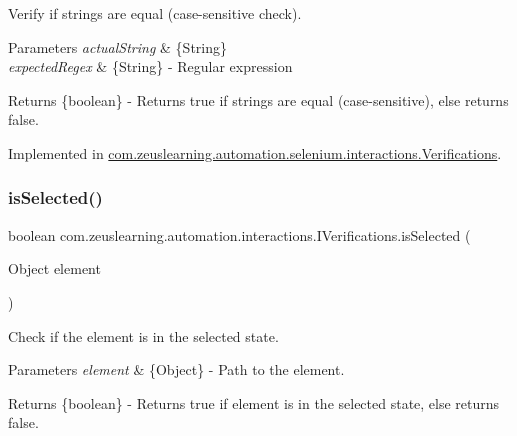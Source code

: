 Verify if strings are equal (case-\/sensitive check).


\begin{DoxyParams}{Parameters}
{\em actual\+String} & \{String\} \\
\hline
{\em expected\+Regex} & \{String\} -\/ Regular expression \\
\hline
\end{DoxyParams}
\begin{DoxyReturn}{Returns}
\{boolean\} -\/ Returns {\ttfamily true} if strings are equal (case-\/sensitive), else returns {\ttfamily false}. 
\end{DoxyReturn}


Implemented in \hyperlink{classcom_1_1zeuslearning_1_1automation_1_1selenium_1_1interactions_1_1Verifications_aec4f646bd4791291b242ad202fd928ea}{com.\+zeuslearning.\+automation.\+selenium.\+interactions.\+Verifications}.

\hypertarget{interfacecom_1_1zeuslearning_1_1automation_1_1interactions_1_1IVerifications_a5525ec4429db243e34b16151f78fa2d9}{}\label{interfacecom_1_1zeuslearning_1_1automation_1_1interactions_1_1IVerifications_a5525ec4429db243e34b16151f78fa2d9} 
\subsubsection{\texorpdfstring{is\+Selected()}{isSelected()}}
{\footnotesize\ttfamily boolean com.\+zeuslearning.\+automation.\+interactions.\+I\+Verifications.\+is\+Selected (\begin{DoxyParamCaption}\item[{Object}]{element }\end{DoxyParamCaption})}

Check if the element is in the selected state.


\begin{DoxyParams}{Parameters}
{\em element} & \{Object\} -\/ Path to the element. \\
\hline
\end{DoxyParams}
\begin{DoxyReturn}{Returns}
\{boolean\} -\/ Returns {\ttfamily true} if element is in the selected state, else returns {\ttfamily false}. 
\end{DoxyReturn}


